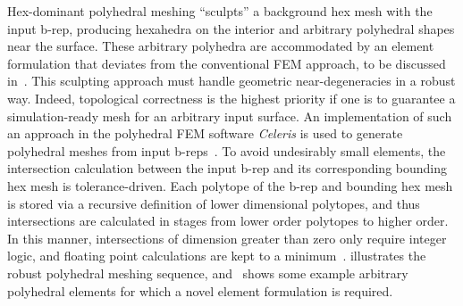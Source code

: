 Hex-dominant polyhedral meshing ``sculpts'' a background hex mesh with the input b-rep, producing hexahedra on the interior and arbitrary polyhedral shapes near the surface. These arbitrary polyhedra are accommodated by an element formulation that deviates from the conventional FEM approach, to be discussed in~. This sculpting approach must handle geometric near-degeneracies in a robust way. Indeed, topological correctness is the highest priority if one is to guarantee a simulation-ready mesh for an arbitrary input surface. An implementation of such an approach in the polyhedral FEM software \textit{Celeris} is used to generate polyhedral meshes from input b-reps~\cite{rashid_2013}. To avoid undesirably small elements, the intersection calculation between the input b-rep and its corresponding bounding hex mesh is tolerance-driven. Each polytope of the b-rep and bounding hex mesh is stored via a recursive definition of lower dimensional polytopes, and thus intersections are calculated in stages from lower order polytopes to higher order. In this manner, intersections of dimension greater than zero only require integer logic, and floating point calculations are kept to a minimum~\cite{rashid_2013}.  illustrates the robust polyhedral meshing sequence, and~ shows some example arbitrary polyhedral elements for which a novel element formulation is required.

